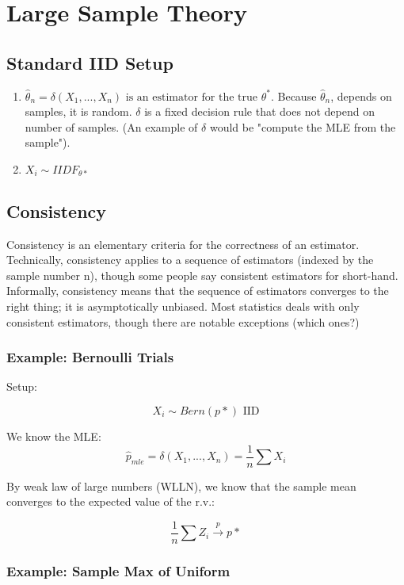 \documentclass[aos,preprint]{imsart}
\numberwithin{equation}{section}
\theoremstyle{plain}
\begin{document}
\section{Large Sample Theory}

\subsection{Standard IID Setup}
\begin{enumerate}
\item $ \hat \theta_n = \delta(X_1, ... , X_n) \text{ is an estimator for the true } \theta^* $.  Because $\hat \theta_n$, depends on samples, it is random. $\delta $  is a fixed decision rule that does not depend on number of samples. (An example of $ \delta $ would be "compute the MLE from the sample").
\item $ X_i \sim IID F_{\theta*} $
\end{enumerate}

\subsection{Consistency}

Consistency is an elementary criteria for the correctness of an estimator. Technically, consistency applies to a sequence of estimators (indexed by the sample number n), though some people say consistent estimators for short-hand. Informally, consistency means that the sequence of estimators converges to the right thing; it is asymptotically unbiased. Most statistics deals with only consistent estimators, though there are notable exceptions (which ones?)

\subsubsection{Example: Bernoulli Trials}

Setup: 

$$ X_i \sim Bern(p*) \text{ IID}$$

We know the MLE: 
$$ \hat p_{mle} = \delta(X_1,..., X_n) = \frac{1}{n} \sum X_i $$

By weak law of large numbers (WLLN), we know that the sample mean converges to the expected value of the r.v.: 

$$ \frac{1}{n}  \sum Z_i \xrightarrow{p} p* $$

\subsubsection{Example: Sample Max of Uniform}
\end{document}
